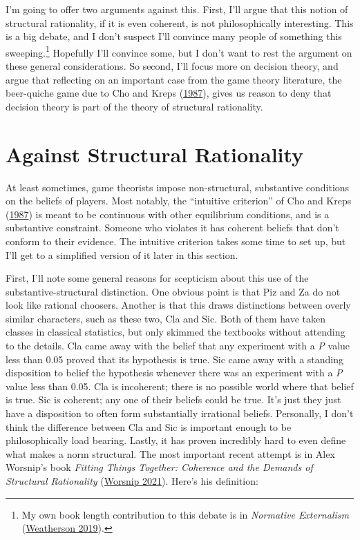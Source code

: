 \documentclass[
  12pt,
  letterpaper,
  DIV=11,
  numbers=noendperiod]{scrreprt}
\begin{document}
I'm going to offer two arguments against this. First, I'll argue that
this notion of structural rationality, if it is even coherent, is not
philosophically interesting. This is a big debate, and I don't suspect
I'll convince many people of something this sweeping.\footnote{My own
  book length contribution to this debate is in \emph{Normative
  Externalism} (\protect\hyperlink{ref-Weatherson2019}{Weatherson
  2019}).} Hopefully I'll convince some, but I don't want to rest the
argument on these general considerations. So second, I'll focus more on
decision theory, and argue that reflecting on an important case from the
game theory literature, the beer-quiche game due to Cho and Kreps
(\protect\hyperlink{ref-ChoKreps1987}{1987}), gives us reason to deny
that decision theory is part of the theory of structural rationality.

\hypertarget{sec-against-structural}{%
\section{Against Structural Rationality}\label{sec-against-structural}}

At least sometimes, game theorists impose non-structural, substantive
conditions on the beliefs of players. Most notably, the ``intuitive
criterion'' of Cho and Kreps
(\protect\hyperlink{ref-ChoKreps1987}{1987}) is meant to be continuous
with other equilibrium conditions, and is a substantive constraint.
Someone who violates it has coherent beliefs that don't conform to their
evidence. The intuitive criterion takes some time to set up, but I'll
get to a simplified version of it later in this section.

First, I'll note some general reasons for scepticism about this use of
the substantive-structural distinction. One obvious point is that Piz
and Za do not look like rational choosers. Another is that this draws
distinctions between overly similar characters, such as these two, Cla
and Sic. Both of them have taken classes in classical statistics, but
only skimmed the textbooks without attending to the details. Cla came
away with the belief that any experiment with a \emph{P} value less than
0.05 proved that its hypothesis is true. Sic came away with a standing
disposition to belief the hypothesis whenever there was an experiment
with a \emph{P} value less than 0.05. Cla is incoherent; there is no
possible world where that belief is true. Sic is coherent; any one of
their beliefs could be true. It's just they just have a disposition to
often form substantially irrational beliefs. Personally, I don't think
the difference between Cla and Sic is important enough to be
philosophically load bearing. Lastly, it has proven incredibly hard to
even define what makes a norm structural. The most important recent
attempt is in Alex Worsnip's book \emph{Fitting Things Together:
Coherence and the Demands of Structural Rationality}
(\protect\hyperlink{ref-Worsnip2021}{Worsnip 2021}). Here's his
definition:
\end{document}
